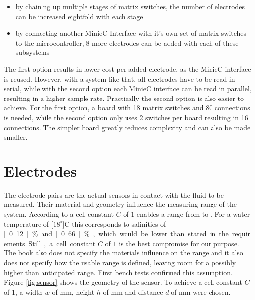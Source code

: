 \begin{itemize}
    \item by chaining up multiple stages of matrix switches, the number of electrodes can be increased eightfold with each stage
    \item by connecting another MinieC Interface with it's own set of matrix switches to the microcontroller, 8 more electrodes can be added with each of these subsystems
\end{itemize}

The first option results in lower cost per added electrode, as the MinieC interface is reused. However, with a system like that, all electrodes have to be read in serial, while with the second option each MinieC interface can be read in parallel, resulting in a higher sample rate. Practically the second option is also easier to achieve. For the first option, a board with 18 matrix switches and 80 connections is needed, while the second option only uses 2 switches per board resulting in 16 connections. The simpler board greatly reduces complexity and can also be made smaller.

\section{Electrodes}

The electrode pairs are the actual sensors in contact with the fluid to be measured. Their material and geometry influence the measuring range of the system. According to  \textcite{trankler2015sensortechnik} a cell constant $ C $ of $1$ enables a range from  to . For a water temperature of \unit[$18^\circ$]{C} this corresponds to salinities of \unit[0.12]{\%} and \unit[0.66]{\%}, which would be lower than stated in the requirements. Still, a cell constant $ C $ of $1$ is the best compromise for our purpose. The book also does not specify the materials influence on the range and it also does not specify how the usable range is defined, leaving room for a possibly higher than anticipated range. First bench tests confirmed this assumption.\\

Figure \ref{fig:sensor} shows the geometry of the sensor. To achieve a cell constant $C$ of $1$, a width $w$ of \unit[1]{mm}, height $h$ of \unit[10]{mm} and distance $d$ of \unit[10]{mm} were chosen.\\

